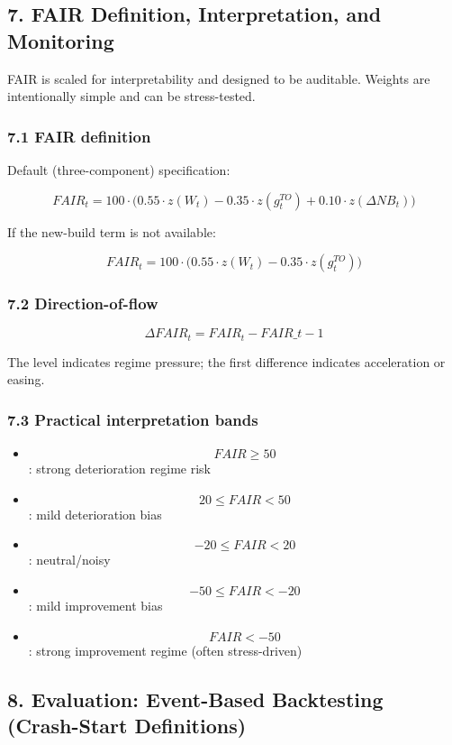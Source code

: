 \documentclass[
]{article}
\providecommand{\tightlist}{%
  \setlength{\itemsep}{0pt}\setlength{\parskip}{0pt}}
\begin{document}
\subsection{7. FAIR Definition, Interpretation, and
Monitoring}\label{fair-definition-interpretation-and-monitoring}

FAIR is scaled for interpretability and designed to be auditable.
Weights are intentionally simple and can be stress-tested.

\subsubsection{7.1 FAIR definition}\label{fair-definition}

Default (three-component) specification:

\[ FAIR_t = 100 \cdot \Big( 0.55 \cdot z(W_t) - 0.35 \cdot z(g_t^{TO}) + 0.10 \cdot z(\Delta NB_t) \Big) \]

If the new-build term is not available:

\[ FAIR_t = 100 \cdot \Big( 0.55 \cdot z(W_t) - 0.35 \cdot z(g_t^{TO}) \Big) \]

\subsubsection{7.2 Direction-of-flow}\label{direction-of-flow}

\[ \Delta FAIR_t = FAIR_t - FAIR\_{t-1} \]

The level indicates regime pressure; the first difference indicates
acceleration or easing.

\subsubsection{7.3 Practical interpretation
bands}\label{practical-interpretation-bands}

\begin{itemize}
\tightlist
\item
  \[FAIR \ge 50\]: strong deterioration regime risk
\item
  \[20 \le FAIR < 50\]: mild deterioration bias
\item
  \[-20 \le FAIR < 20\]: neutral/noisy
\item
  \[-50 \le FAIR < -20\]: mild improvement bias
\item
  \[FAIR < -50\]: strong improvement regime (often stress-driven)
\end{itemize}

\subsection{8. Evaluation: Event-Based Backtesting (Crash-Start
Definitions)}\label{evaluation-event-based-backtesting-crash-start-definitions}
\end{document}
